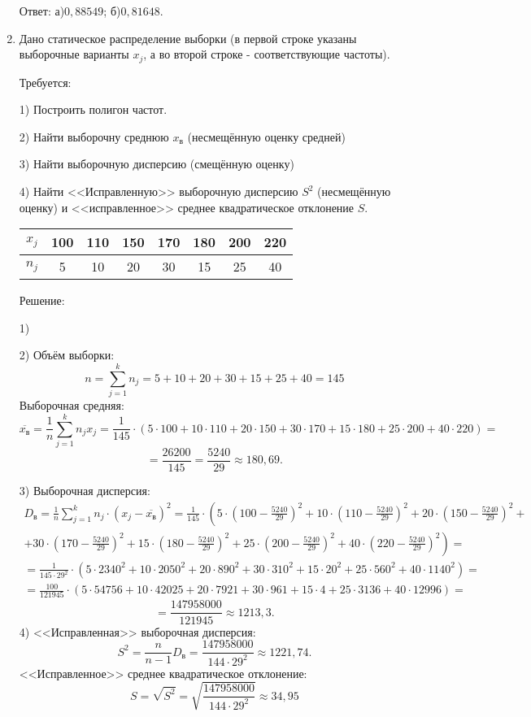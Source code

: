 \documentclass{article}
\begin{document}
\begin{enumerate}
Ответ: а)$0,88549$; б)$0,81648$.

\item %
Дано статическое распределение выборки (в первой строке указаны выборочные варианты $x_j$, а во второй строке - соответствующие частоты).

Требуется:

1) Построить полигон частот.

2) Найти выборочну среднюю $x_\textit{в}$ (несмещённую оценку средней)

3) Найти выборочную дисперсию (смещённую оценку)

4) Найти <<Исправленную>> выборочную дисперсию $S^2$ (несмещённую оценку) и <<исправленное>> среднее квадратическое отклонение $S$.

\begin{center}
\begin{tabular}{|c|c|c|c|c|c|c|c|}
\hline
$x_j$ & 100 & 110 & 150 & 170 & 180 & 200 & 220 \\
\hline
$n_j$ & 5 & 10 & 20 & 30 & 15 & 25 & 40 \\
\hline
\end{tabular}
\end{center}
\begin{center}Решение:\end{center}
1)

2)  Объём выборки: $$n=\sum_{j=1}^k n_j=5+10+20+30+15+25+40=145$$
Выборочная средняя:
$$\overline{x_\textit{в}}=\frac{1}{n}\sum_{j=1}^k n_j x_j=\frac{1}{145}\cdot\left(5\cdot100+10\cdot110+20\cdot150+30\cdot170+15\cdot180+25\cdot200+40\cdot220\right)=$$
$$=\frac{26200}{145}=\frac{5240}{29}\approx180,69.$$

3) Выборочная дисперсия:
\begin{multline*}
D_{\textit{в}}=\frac{1}{n}\sum_{j=1}^k n_j
\cdot\left(x_j-\overline{x_\textit{в}}\right)^2=
\frac{1}{145}\cdot\left(5\cdot\left(100-\frac{5240}{29}\right)^2+10\cdot\left(110-\frac{5240}{29}\right)^2+20\cdot\left(150-\frac{5240}{29}\right)^2+\right.\\
+\left.30\cdot\left(170-\frac{5240}{29}\right)^2+15\cdot\left(180-\frac{5240}{29}\right)^2+25\cdot\left(200-\frac{5240}{29}\right)^2+40\cdot\left(220-\frac{5240}{29}\right)^2\right)=\\
=\frac{1}{145\cdot29^2}\cdot\left(5\cdot2340^2+10\cdot2050^2+20\cdot890^2+30\cdot310^2+15\cdot20^2+25\cdot560^2+40\cdot1140^2\right)=\\
=\frac{100}{121945}\cdot\left(5\cdot54756+10\cdot42025+20\cdot7921+30\cdot961+15\cdot4+25\cdot3136+40\cdot12996\right)=
\end{multline*}
$$=\frac{147958000}{121945}\approx1213,3.$$
4) <<Исправленная>> выборочная дисперсия:
$$S^2=\frac{n}{n-1}D_{\textit{в}}=\frac{147958000}{144\cdot29^2}\approx1221,74.$$
<<Исправленное>> среднее квадратическое отклонение:
$$S=\sqrt{S^2}=\sqrt{\frac{147958000}{144\cdot29^2}}\approx34,95$$


\end{enumerate}
\end{document}
